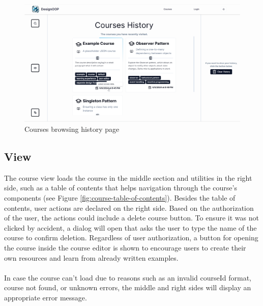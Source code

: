 \begin{figure}[h]
    \centering
    \includegraphics[scale=0.33]{images/courses-history.png}
    \caption{Courses browsing history page}
    \label{fig:courses-history}
\end{figure}

\subsection{View}

\noindent The course view loads the course in the middle section and utilities in the right side, such as a table of contents that helps navigation through the course's components (see Figure \ref{fig:course-table-of-contents}). Besides the table of contents, user actions are declared on the right side. Based on the authorization of the user, the actions could include a delete course button. To ensure it was not clicked by accident, a dialog will open that asks the user to type the name of the course to confirm deletion. Regardless of user authorization, a button for opening the course inside the course editor is shown to encourage users to create their own resources and learn from already written examples.
\\\\
\noindent In case the course can't load due to reasons such as an invalid courseId format, course not found, or unknown errors, the middle and right sides will display an appropriate error message.

